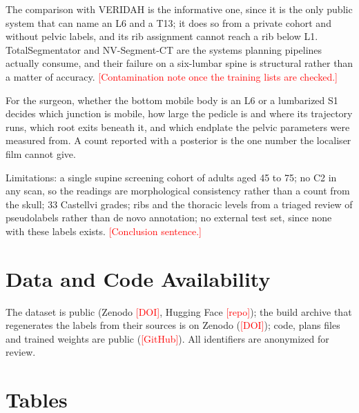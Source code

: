 \documentclass[12pt]{article}
\newcommand{\todo}[1]{\textcolor{red}{[#1]}}
\begin{document}
The comparison with VERIDAH is the informative one, since it is the only public system that can name an L6 and a T13; it does so from a private cohort and without pelvic labels, and its rib assignment cannot reach a rib below L1. TotalSegmentator and NV-Segment-CT are the systems planning pipelines actually consume, and their failure on a six-lumbar spine is structural rather than a matter of accuracy. \todo{Contamination note once the training lists are checked.}

For the surgeon, whether the bottom mobile body is an L6 or a lumbarized S1 decides which junction is mobile, how large the pedicle is and where its trajectory runs, which root exits beneath it, and which endplate the pelvic parameters were measured from. A count reported with a posterior is the one number the localiser film cannot give.

Limitations: a single supine screening cohort of adults aged 45 to 75; no C2 in any scan, so the readings are morphological consistency rather than a count from the skull; 33 Castellvi grades; ribs and the thoracic levels from a triaged review of pseudolabels rather than de novo annotation; no external test set, since none with these labels exists. \todo{Conclusion sentence.}

\section*{Data and Code Availability}
The dataset is public (Zenodo \todo{DOI}, Hugging Face \todo{repo}); the build archive that regenerates the labels from their sources is on Zenodo (\todo{DOI}); code, plans files and trained weights are public (\todo{GitHub}). All identifiers are anonymized for review.




\clearpage
\section*{Tables}
\renewcommand{\thetable}{\arabic{table}}


\begin{table}[h]
\caption{What each system can name. Filled: a class or output the released system produces. Open: in the released labels and in the arm reported here.}
\centering\small

\end{table}
\end{document}
